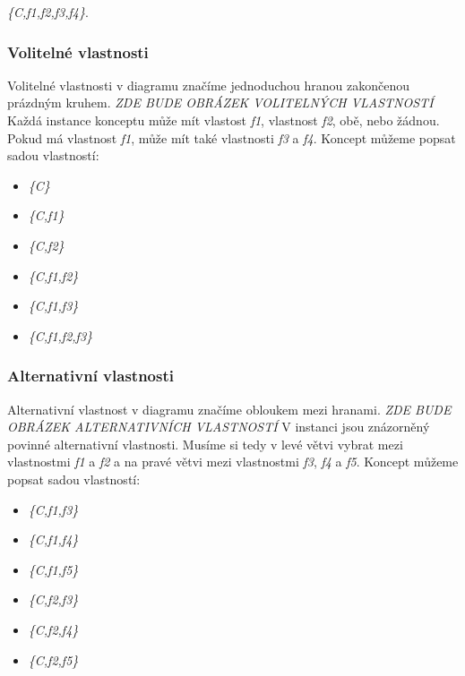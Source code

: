 \textit{\{C,f1,f2,f3,f4\}}.

\subsubsection{Volitelné vlastnosti}
Volitelné vlastnosti v diagramu značíme jednoduchou hranou zakončenou prázdným kruhem.
\newline
\newline
\textit{ZDE BUDE OBRÁZEK VOLITELNÝCH VLASTNOSTÍ}
\newline
\newline
Každá instance konceptu může mít vlastost \textit{f1}, vlastnost \textit{f2}, obě, nebo žádnou. Pokud má vlastnost \textit{f1}, může mít také vlastnosti \textit{f3} a \textit{f4}. Koncept můžeme popsat sadou vlastností: 
\begin{itemize}
	\item \textit{\{C\}}
	\item \textit{\{C,f1\}}
	\item \textit{\{C,f2\}}
	\item \textit{\{C,f1,f2\}}
	\item \textit{\{C,f1,f3\}}
	\item \textit{\{C,f1,f2,f3\}}
\end{itemize}

\subsubsection{Alternativní vlastnosti}
Alternativní vlastnost v diagramu značíme obloukem mezi hranami.
\newline
\newline
\textit{ZDE BUDE OBRÁZEK ALTERNATIVNÍCH VLASTNOSTÍ}
\newline
\newline
V instanci jsou znázorněný povinné alternativní vlastnosti. Musíme si tedy v levé větvi vybrat mezi vlastnostmi \textit{f1} a \textit{f2} a na pravé větvi mezi vlastnostmi \textit{f3}, \textit{f4} a \textit{f5}. Koncept můžeme popsat sadou vlastností:
\begin{itemize}
	\item \textit{\{C,f1,f3\}}
	\item \textit{\{C,f1,f4\}}
	\item \textit{\{C,f1,f5\}}
	\item \textit{\{C,f2,f3\}}
	\item \textit{\{C,f2,f4\}}
	\item \textit{\{C,f2,f5\}}
\end{itemize}

